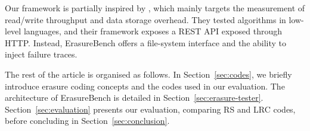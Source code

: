 Our framework is partially inspired by \autocite{Burihabwa2016}, which mainly targets
the measurement of read/write throughput and data storage overhead. 
They tested algorithms in low-level languages, and their framework exposes a REST API exposed through HTTP.
Instead, ErasureBench offers a file-system interface and the ability to inject failure traces.






The rest of the article is organised as follows. 
In Section~\ref{sec:codes}, we briefly introduce erasure coding concepts and the codes used in our evaluation. 
The architecture of ErasureBench is detailed in Section~\ref{sec:erasure-tester}. 
Section~\ref{sec:evaluation} presents our evaluation, comparing RS and LRC codes, before concluding in Section~\ref{sec:conclusion}. 
